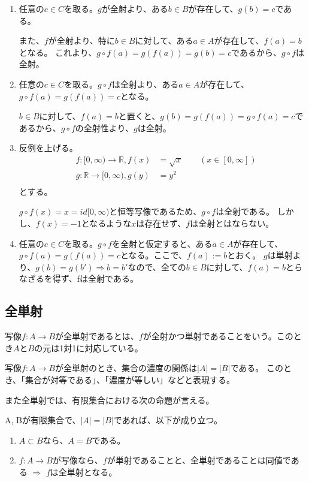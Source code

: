 \documentclass[dvipdfmx,autodetect-engine]{jsarticle}
\begin{document}
\begin{enumerate}
\renewcommand{\labelenumi}{(\arabic{enumi})}
	\item 任意の$c \in C$を取る。$g$が全射より、ある$b \in B$が存在して、$g(b) = c$である。
	
	また、$f$が全射より、特に$b \in B$に対して、ある$a \in A$が存在して、$f(a) = b$となる。
	これより、$g \circ f(a) = g(f(a)) = g(b) = c$であるから、$g \circ f$は全射。
	
	\item 任意の$c \in C$を取る。$g \circ f$は全射より、ある$a \in A$が存在して、$g \circ f(a) = g(f(a)) = c$となる。
	
	$b \in B$に対して、$f(a) = b$と置くと、$g(b) = g(f(a)) = g \circ f(a) = c$であるから、$g \circ f$の全射性より、$g$は全射。
	
    \item 反例を上げる。
    \begin{eqnarray*}
    &f:[0,∞) \to \mathbb{R}, f(x) &= \sqrt{x} \quad \quad (x \in [0,∞]) \\
    &g:\mathbb{R} \to [0, ∞), g(y) &= y^2 \\
    \end{eqnarray*}
    とする。
    
    $g \circ f(x) = x = id[0,∞)$と恒等写像であるため、$g \circ f$は全射である。
    しかし、$f(x) = −1$となるような$x$は存在せず、$f$は全射とはならない。
	
	\item 任意の$c \in C$を取る。$g \circ f$を全射と仮定すると、ある$a \in A$が存在して、$g \circ f(a) = g(f(a)) = c$となる。ここで、$f(a) := b$とおく。
	$g$は単射より、$g(b) = g(b') \Rightarrow b = b'$なので、全ての$b \in B$に対して、$f(a) = b$とらなざるを得ず、fは全射である。
\end{enumerate}


\subsection{全単射}

写像$f: A \to B$が全単射であるとは、$f$が全射かつ単射であることをいう。このとき$A$と$B$の元は1対1に対応している。

写像$f: A \to B$が全単射のとき、集合の濃度の関係は$|A| = |B|$である。
このとき、「集合が対等である」、「濃度が等しい」などと表現する。

また全単射では、有限集合における次の命題が言える。

\prop

A, Bが有限集合で、$|A| = |B|$であれば、以下が成り立つ。
\begin{enumerate}
\renewcommand{\labelenumi}{(\arabic{enumi})}
\item $A \subset B$なら、$A = B$である。
\item $f: A \to B$が写像なら、$f$が単射であることと、全単射であることは同値である $\Rightarrow$ $f$は全単射となる。
\end{enumerate}
\end{document}
